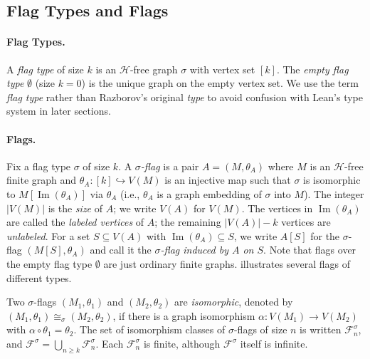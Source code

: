 \documentclass{article}
\begin{document}
\subsection{Flag Types and Flags}


\paragraph{Flag Types.}
A \emph{flag type} of size $k$ is an $\mathcal{H}$-free graph $\sigma$ with vertex set $[k]$.
The \emph{empty flag type} $\emptyset$ (size $k=0$) is the unique graph on the
empty vertex set.
We use the term \emph{flag type} rather than Razborov's original \emph{type}
to avoid confusion with Lean's type system in later sections.

\paragraph{Flags.}
Fix a flag type $\sigma$ of size $k$.
A \emph{$\sigma$-flag} is a pair $A = (M, \theta_A)$ where $M$ is an
$\mathcal{H}$-free finite graph and $\theta_A : [k] \hookrightarrow V(M)$ is an injective map such
that $\sigma$ is isomorphic to $M[\operatorname{Im}(\theta_A)]$ via $\theta_A$
(i.e., $\theta_A$ is a graph embedding of $\sigma$ into $M$).
The integer $|V(M)|$ is the \emph{size} of $A$; we write $V(A)$ for $V(M)$.
The vertices in $\operatorname{Im}(\theta_A)$ are called the \emph{labeled vertices} of $A$; the remaining $|V(A)|-k$ vertices are \emph{unlabeled}.
For a set $S \subseteq V(A)$ with $\operatorname{Im}(\theta_A) \subseteq S$,
we write $A[S]$ for the $\sigma$-flag $(M[S], \theta_A)$ and call it the
\emph{$\sigma$-flag induced by $A$ on $S$}.
Note that flags over the empty flag type $\emptyset$ are just ordinary finite graphs.
 illustrates several flags of different types.

Two $\sigma$-flags $(M_1,\theta_1)$ and $(M_2,\theta_2)$ are
\emph{isomorphic}, denoted by $(M_1,\theta_1) \cong_\sigma (M_2,\theta_2)$,
if there is a graph isomorphism $\alpha: V(M_1)\to V(M_2)$
with $\alpha \circ \theta_1 = \theta_2$.  The set of isomorphism classes of
$\sigma$-flags of size $n$ is written $\mathcal{F}^\sigma_n$, and
$\mathcal{F}^\sigma = \bigcup_{n \geq k} \mathcal{F}^\sigma_n$.
Each $\mathcal{F}^\sigma_n$ is finite, although
$\mathcal{F}^\sigma$ itself is infinite.
\end{document}
